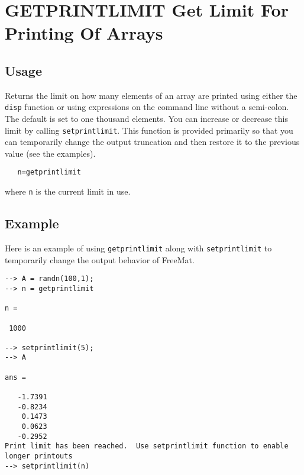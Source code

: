 \section{GETPRINTLIMIT Get Limit For Printing Of Arrays}

\subsection{Usage}

Returns the limit on how many elements of an array are printed
using either the \verb|disp| function or using expressions on the
command line without a semi-colon.  The default is set to 
one thousand elements.  You can increase or decrease this
limit by calling \verb|setprintlimit|.  This function is provided
primarily so that you can temporarily change the output truncation
and then restore it to the previous value (see the examples).
\begin{verbatim}
   n=getprintlimit
\end{verbatim}
where \verb|n| is the current limit in use.
\subsection{Example}

Here is an example of using \verb|getprintlimit| along with \verb|setprintlimit| to temporarily change the output behavior of FreeMat.
\begin{verbatim}
--> A = randn(100,1);
--> n = getprintlimit

n = 

 1000 

--> setprintlimit(5);
--> A

ans = 

   -1.7391 
   -0.8234 
    0.1473 
    0.0623 
   -0.2952
Print limit has been reached.  Use setprintlimit function to enable longer printouts
--> setprintlimit(n)
\end{verbatim}
